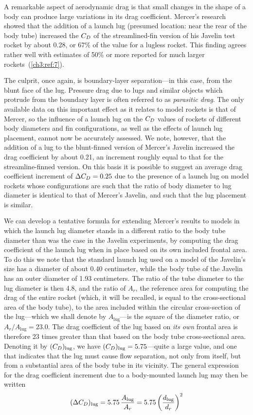 A remarkable aspect of aerodynamic drag is that small changes in the shape of
a body can produce large variations in its drag coefficient. Mercer's research
showed that the addition of a launch lug (presumed location: near the rear of
the body tube) increased the $C_{D}$ of the streamlined-fin version of his
Javelin test rocket by about 0.28, or 67\% of the value for a lugless rocket.
This finding agrees rather well with estimates of 50\% or more reported for
much larger rockets~(\ref{ch3:ref:7}).

The culprit, once again, is boundary-layer separation---in this case, from the
blunt face of the lug. Pressure drag due to lugs and similar objects which
protrude from the boundary layer is often referred to as \emph{parasitic
drag}. The only available data on this important effect as it relates to
model rockets is that of Mercer, so the influence of a launch lug on the $C_{D}$
values of rockets of different body diameters and fin configurations, as well
as the effects of launch lug placement, cannot now be accurately assessed. We
note, however, that the addition of a lug to the blunt-finned version of
Mercer's Javelin increased the drag coefficient by about 0.21, an increment
roughly equal to that for the streamline-finned version. On this basis it is
possible to suggest an average drag coefficient increment of
$\Delta C_{D} = 0.25$ due to the presence of a launch lug on model rockets whose
configurations are such that the ratio of body diameter to lug diameter is
identical to that of Mercer's Javelin, and such that the lug placement is
similar.

We can develop a tentative formula for extending Mercer's results to models in
which the launch lug diameter stands in a different ratio to the body tube
diameter than was the case in the Javelin experiments, by computing the drag
coefficient of the launch lug when in place based on its own included frontal
area. To do this we note that the standard launch lug used on a model of the
Javelin's size has a diameter of about 0.40 centimeter, while the body tube of
the Javelin has an outer diameter of 1.93 centimeters. The ratio of the tube
diameter to the lug diameter is then 4.8, and the ratio of $A_r$, the
reference area for computing the drag of the entire rocket (which, it will be
recalled, is equal to the cross-sectional area of the body tube), to the area
included within the circular cross-section of the lug---which we shall denote
by $A_{\mathrm{lug}}$---is the square of the diameter ratio, or
$A_r/A_{\mathrm{lug}} = 23.0$. The drag coefficient of the lug based on
\emph{its own} frontal area is therefore 23 times greater than that based on
the body tube cross-sectional area. Denoting it by $(C_{D})_{\mathrm{lug}}$, we
have $(C_{D})_{\mathrm{lug}} = 5.75$---quite a large value, and one that
indicates that the lug must cause flow separation, not only from itself, but
from a substantial area of the body tube in its vicinity. The general
expression for the drag coefficient increment due to a body-mounted launch lug
may then be written
\begin{equation}\label{ch3:eq:119}
(\Delta C_{D})_{\mathrm{lug}} = 5.75\,\frac{A_{\mathrm{lug}}}{A_r}
  = 5.75\left(\frac{d_{\mathrm{lug}}}{d_r}\right)^{2}
\end{equation}

